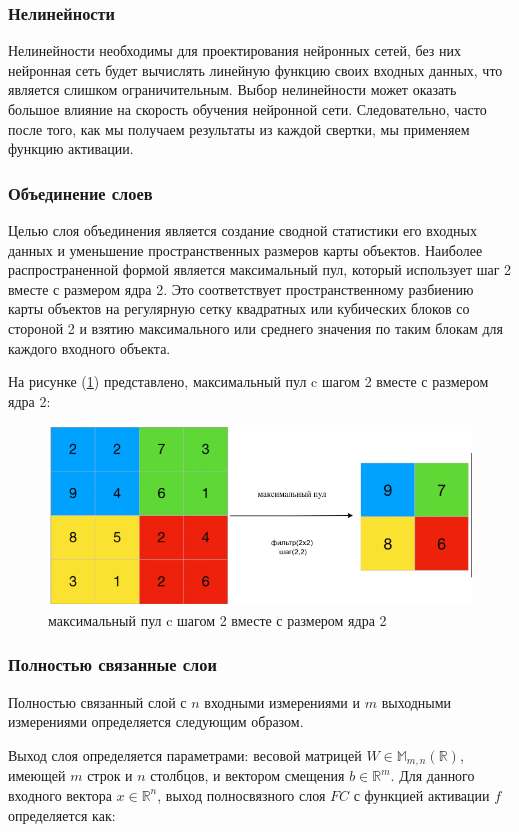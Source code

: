 \subsubsection*{Нелинейности}

Нелинейности необходимы для проектирования нейронных сетей, без них нейронная сеть будет вычислять линейную функцию своих входных данных, что является слишком ограничительным. Выбор нелинейности может оказать большое влияние на скорость обучения нейронной сети. Следовательно, часто после того, как мы получаем результаты из каждой свертки, мы применяем функцию активации.

\subsubsection*{Объединение слоев}

Целью слоя объединения является создание сводной статистики его входных данных и уменьшение пространственных размеров карты объектов. Наиболее распространенной формой является максимальный пул, который использует шаг 2 вместе с размером ядра 2. Это соответствует пространственному разбиению карты объектов на регулярную сетку квадратных или кубических блоков со стороной 2 и взятию максимального или среднего значения по таким блокам для каждого входного объекта.

На рисунке (\ref{fig:max-pool}) представлено, максимальный пул c шагом 2 вместе с размером ядра 2: 
\begin{figure}[H]
	\centering
	\includegraphics[width=0.5\linewidth]{images/max-pooling.png}
	\caption{максимальный пул c шагом 2 вместе с размером ядра 2}
	\label{fig:max-pool}
\end{figure}

\subsubsection*{Полностью связанные слои}

Полностью связанный слой с \(n\) входными измерениями и \(m\) выходными измерениями определяется следующим образом.

Выход слоя определяется параметрами: весовой матрицей \(W \in \mathbb{M}_{m,n}(\mathbb{R})\), имеющей \(m\) строк и \(n\) столбцов, и вектором смещения \(b \in \mathbb{R}^{m}\). Для данного входного вектора \(x \in \mathbb{R}^{n}\), выход полносвязного слоя \(FC\) с функцией активации \newpage \(f\) определяется как:

